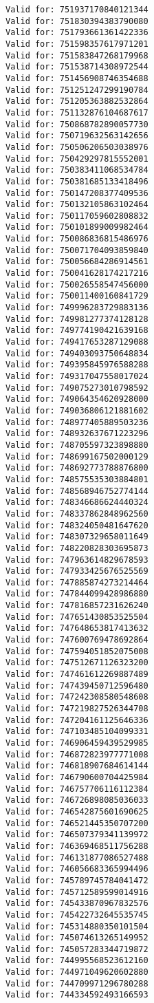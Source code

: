 \documentclass[11pt]{article}
\begin{document}
\begin{Verbatim}[commandchars=\\\{\}]
Valid for: 751937170840121344
Valid for: 751830394383790080
Valid for: 751793661361422336
Valid for: 751598357617971201
Valid for: 751583847268179968
Valid for: 751538714308972544
Valid for: 751456908746354688
Valid for: 751251247299190784
Valid for: 751205363882532864
Valid for: 751132876104687617
Valid for: 750868782890057730
Valid for: 750719632563142656
Valid for: 750506206503038976
Valid for: 750429297815552001
Valid for: 750383411068534784
Valid for: 750381685133418496
Valid for: 750147208377409536
Valid for: 750132105863102464
Valid for: 750117059602808832
Valid for: 750101899009982464
Valid for: 750086836815486976
Valid for: 750071704093859840
Valid for: 750056684286914561
Valid for: 750041628174217216
Valid for: 750026558547456000
Valid for: 750011400160841729
Valid for: 749996283729883136
Valid for: 749981277374128128
Valid for: 749774190421639168
Valid for: 749417653287129088
Valid for: 749403093750648834
Valid for: 749395845976588288
Valid for: 749317047558017024
Valid for: 749075273010798592
Valid for: 749064354620928000
Valid for: 749036806121881602
Valid for: 748977405889503236
Valid for: 748932637671223296
Valid for: 748705597323898880
Valid for: 748699167502000129
Valid for: 748692773788876800
Valid for: 748575535303884801
Valid for: 748568946752774144
Valid for: 748346686624440324
Valid for: 748337862848962560
Valid for: 748324050481647620
Valid for: 748307329658011649
Valid for: 748220828303695873
Valid for: 747963614829678593
Valid for: 747933425676525569
Valid for: 747885874273214464
Valid for: 747844099428986880
Valid for: 747816857231626240
Valid for: 747651430853525504
Valid for: 747648653817413632
Valid for: 747600769478692864
Valid for: 747594051852075008
Valid for: 747512671126323200
Valid for: 747461612269887489
Valid for: 747439450712596480
Valid for: 747242308580548608
Valid for: 747219827526344708
Valid for: 747204161125646336
Valid for: 747103485104099331
Valid for: 746906459439529985
Valid for: 746872823977771008
Valid for: 746818907684614144
Valid for: 746790600704425984
Valid for: 746757706116112384
Valid for: 746726898085036033
Valid for: 746542875601690625
Valid for: 746521445350707200
Valid for: 746507379341139972
Valid for: 746369468511756288
Valid for: 746131877086527488
Valid for: 746056683365994496
Valid for: 745789745784041472
Valid for: 745712589599014916
Valid for: 745433870967832576
Valid for: 745422732645535745
Valid for: 745314880350101504
Valid for: 745074613265149952
Valid for: 745057283344719872
Valid for: 744995568523612160
Valid for: 744971049620602880
Valid for: 744709971296780288
Valid for: 744334592493166593

\end{Verbatim}
\end{document}
